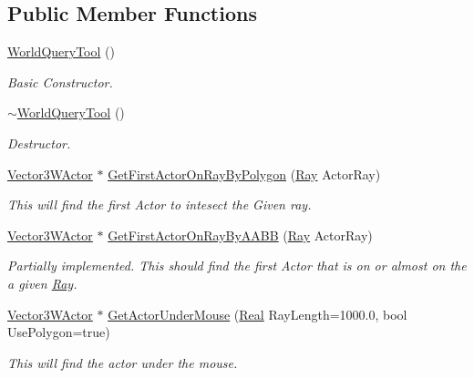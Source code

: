 \subsection*{Public Member Functions}
\begin{DoxyCompactItemize}
\item 
\hyperlink{classphys_1_1WorldQueryTool_ada25e2dfced63cfdb0a2db436f1bd6a8}{WorldQueryTool} ()
\begin{DoxyCompactList}\small\item\em Basic Constructor. \item\end{DoxyCompactList}\item 
\hyperlink{classphys_1_1WorldQueryTool_ace36ffebcabbbf0553c517820bc636c9}{$\sim$WorldQueryTool} ()
\begin{DoxyCompactList}\small\item\em Destructor. \item\end{DoxyCompactList}\item 
\hyperlink{classphys_1_1Vector3WActor}{Vector3WActor} $\ast$ \hyperlink{classphys_1_1WorldQueryTool_a256022003d64756b0b5c5706aefd5139}{GetFirstActorOnRayByPolygon} (\hyperlink{classphys_1_1Ray}{Ray} ActorRay)
\begin{DoxyCompactList}\small\item\em This will find the first Actor to intesect the Given ray. \item\end{DoxyCompactList}\item 
\hyperlink{classphys_1_1Vector3WActor}{Vector3WActor} $\ast$ \hyperlink{classphys_1_1WorldQueryTool_a67575416c2e9c652bbd873649ee38baf}{GetFirstActorOnRayByAABB} (\hyperlink{classphys_1_1Ray}{Ray} ActorRay)
\begin{DoxyCompactList}\small\item\em Partially implemented. This should find the first Actor that is on or almost on the a given \hyperlink{classphys_1_1Ray}{Ray}. \item\end{DoxyCompactList}\item 
\hyperlink{classphys_1_1Vector3WActor}{Vector3WActor} $\ast$ \hyperlink{classphys_1_1WorldQueryTool_a8efba55076bad228d7cda0b82895f32a}{GetActorUnderMouse} (\hyperlink{namespacephys_af7eb897198d265b8e868f45240230d5f}{Real} RayLength=1000.0, bool UsePolygon=true)
\begin{DoxyCompactList}\small\item\em This will find the actor under the mouse. \item\end{DoxyCompactList}\item 

\end{DoxyCompactItemize}
